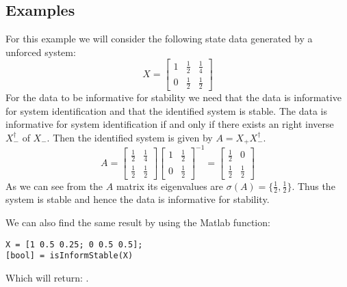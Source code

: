 \subsection{Examples}
For this example we will consider the following state data generated by a unforced system:
\[ X = \begin{bmatrix}
1 & \frac{1}{2} & \frac{1}{4} \\ 0 & \frac{1}{2} & \frac{1}{2}
\end{bmatrix} \]
For the data to be informative for stability we need that the data is informative for system identification and that the identified system is stable. The data is informative for system identification if and only if there exists an right inverse $X_-^\dagger$ of $X_-$. Then the identified system is given by $A = X_+ X_-^\dagger$.
\[ A = \begin{bmatrix}
\frac{1}{2} & \frac{1}{4} \\ \frac{1}{2} & \frac{1}{2}
\end{bmatrix} \begin{bmatrix}
1 & \frac{1}{2} \\ 0 & \frac{1}{2}
\end{bmatrix}^{-1} = \begin{bmatrix} \frac{1}{2} & 0 \\ \frac{1}{2} & \frac{1}{2} \end{bmatrix} \]
As we can see from the $A$ matrix its eigenvalues are $\sigma(A) = \{\frac{1}{2}, \frac{1}{2}\}$. Thus the system is stable and hence the data is informative for stability.

We can also find the same result by using the Matlab function:
\begin{lstlisting}
X = [1 0.5 0.25; 0 0.5 0.5];
[bool] = isInformStable(X)
\end{lstlisting}
Which will return: \mon{[ 1 ]}.
